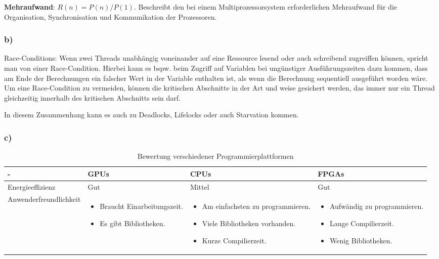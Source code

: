 \documentclass{report}
\begin{document}
        \textbf{Mehraufwand}: $ R(n) = P(n)/P(1) $. Beschreibt den bei einem Multiprozessorsystem erforderlichen Mehraufwand für die Organisation, Synchronisation und Kommunikation der Prozessoren.\\
        
        \subsubsection{b)}
        Race-Conditions: Wenn zwei Threads unabhängig voneinander auf eine Ressource lesend oder auch schreibend zugreiffen können, 
        spricht man von einer Race-Condition. Hierbei kann es bspw. beim Zugriff auf Variablen bei ungünstiger Ausführungszeiten
        dazu kommen, dass am Ende der Berechnungen ein falscher Wert in der Variable enthalten ist, als wenn die Berechnung sequentiell 
        ausgeführt worden wäre.
        Um eine Race-Condition zu vermeiden, können die kritischen Abschnitte in der Art und weise gesichert werden, das immer nur ein 
        Thread gleichzeitig innerhalb des kritischen Abschnitts sein darf.

        In diesem Zusammenhang kann es auch zu Deadlocks, Lifelocks oder auch Starvation kommen. 
        \subsubsection{c)}
        \begin{table}
        \begin{tabular}{|p{4cm}|p{3cm}|p{3cm}|p{3cm}|}
        	\hline
        	- & GPUs & CPUs & FPGAs \\
        	\hline
        	Energieeffizienz & Gut & Mittel & Gut  \\
        	\hline
        	Anwenderfreundlichkeit & \begin{itemize}
        		\item Braucht Einarbeitungszeit.
        		\item Es gibt Bibliotheken.
        	\end{itemize} & 
        \begin{itemize}
        	\item Am einfachsten zu programmieren.
        	\item Viele Bibliotheken vorhanden. 
        	\item Kurze Compilierzeit.
        \end{itemize}  & \begin{itemize}
        \item Aufwändig zu programmieren.
        \item Lange Compilierzeit.
        \item Wenig Bibliotheken.
    \end{itemize}  \\
        	\hline
        \end{tabular}
        \caption{Bewertung verschiedener Programmierplattformen}
        \label{Table:3c}
        \end{table}
    
\end{document}
